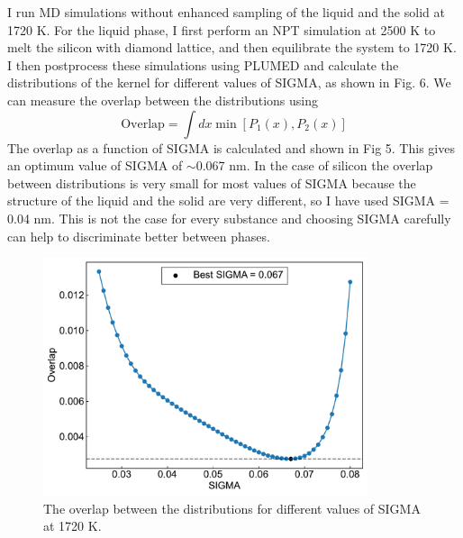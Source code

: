 \documentclass{article}
\begin{document}
I run MD simulations without enhanced sampling of the liquid and the solid at 1720 K. For the liquid phase, I first perform an NPT simulation at 2500 K to melt the silicon with diamond lattice, and then equilibrate the system to 1720 K. I then postprocess these simulations using PLUMED and calculate the distributions of the kernel for different values of SIGMA, as shown in Fig. 6. We can measure the overlap between the distributions using
\begin{equation}
    \textrm{Overlap} = \int dx \min[ P_1(x), P_2(x) ] 
\end{equation}
The overlap as a function of SIGMA is calculated and shown in Fig 5. This gives an optimum value of SIGMA of $\sim$0.067 nm. In the case of silicon the overlap between distributions is very small for most values of SIGMA because the structure of the liquid and the solid are very different, so I have used SIGMA = 0.04 nm. This is not the case for every substance and choosing SIGMA carefully can help to discriminate better between phases. 

\begin{figure}[h!]
    \centering
    \includegraphics[width=0.85\textwidth]{./plot/overlap.pdf}
    \caption{The overlap between the distributions for different values of SIGMA at 1720 K.}
\end{figure}
\end{document}
